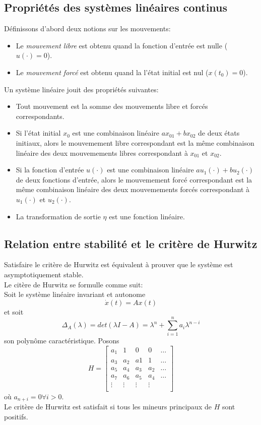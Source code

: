 \documentclass[a4paper]{article}
\begin{document}
\subsection{Propriétés des systèmes linéaires continus}
Définissons d'abord deux notions sur les mouvements:
\begin{itemize}
	\item Le \emph{mouvement libre} est obtenu quand la fonction d'entrée est
		nulle ($u(\cdot)=0$).
	\item Le \emph{mouvement forcé} est obtenu quand la l'état initial est nul
		($x(t_0)=0$).
\end{itemize}
Un système linéaire jouit des propriétés suivantes:
\begin{itemize}
	\item Tout mouvement est la somme des mouvements libre et forcés
		correspondants.
	\item Si l'état initial $x_0$ est une combinaison linéaire
		$ax_{01} + bx_{02}$ de deux états initiaux, alors le mouvemement libre
		correspondant est la même combinaison linéaire des deux mouvemements
		libres correspondant à $x_{01}$ et $x_{02}$.
	\item Si la fonction d'entrée $u(\cdot)$ est une combinaison linéaire
		$au_1(\cdot) + bu_2(\cdot)$ de deux fonctions d'entrée, alors le
		mouvemement forcé correspondant est la même combinaison linéaire des
		deux mouvemements forcés correspondant à $u_1(\cdot)$ et $u_2(\cdot)$.
	\item La transformation de sortie $\eta$ est une fonction linéaire.
\end{itemize}
\subsection{Relation entre stabilité et le critère de Hurwitz}
Satisfaire le critère de Hurwitz est équivalent à prouver que le système
est asymptotiquement stable.\\
Le citère de Hurwitz se formulle comme suit:\\
Soit le système linéaire invariant et autonome
\[\dot x(t)=Ax(t)\]
et soit
\[\Delta_A(\lambda)=det(\lambda I - A)
= \lambda^n+\sum_{i=1}^na_i\lambda^{n-i}\]
son polynôme caractéristique. Posons
\[H=\begin{bmatrix}
	a_1 & 1 & 0 & 0 & \dots \\
	a_3 & a_2 & a1 & 1 & \dots \\
	a_5 & a_4 & a_3 & a_2 & \dots \\
	a_7 & a_6 & a_5 & a_4 & \dots \\
	\vdots & \vdots & \vdots & \vdots & \\
\end{bmatrix}
\]
où $a_{n+i} = 0 \forall i > 0$.\\
Le critère de Hurwitz est satisfait si tous les mineurs principaux de $H$ sont
positifs.
\end{document}
